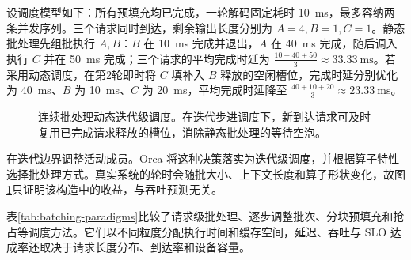 \documentclass[../textbook.tex]{subfiles}
\begin{document}
\begin{example}
设调度模型如下：所有预填充均已完成，一轮解码固定耗时 \qty{10}{\milli\second}，最多容纳两条并发序列。三个请求同时到达，剩余输出长度分别为 $A=4,B=1,C=1$。静态批处理先组批执行 $A,B$：$B$ 在 \qty{10}{\milli\second} 完成并退出，$A$ 在 \qty{40}{\milli\second} 完成，随后调入执行 $C$ 并在 \qty{50}{\milli\second} 完成；三个请求的平均完成时延为 $\frac{10+40+50}{3}\approx \qty{33.33}{\milli\second}$。若采用动态调度，在第2轮即时将 $C$ 填补入 $B$ 释放的空闲槽位，完成时延分别优化为 \qty{40}{\milli\second}、$B$ 为 \qty{10}{\milli\second}、$C$ 为 \qty{20}{\milli\second}，平均完成时延降至 $\frac{40+10+20}{3}\approx \qty{23.33}{\milli\second}$。

\begin{figure}[htbp]
\centering
{}
\caption[连续批处理动态迭代级调度]{连续批处理动态迭代级调度。在迭代步进调度下，新到达请求可及时复用已完成请求释放的槽位，消除静态批处理的等待空泡。}\label{fig:schedule-continuous}
\end{figure}

在迭代边界调整活动成员。Orca 将这种决策落实为迭代级调度，并根据算子特性选择批处理方式\cite{yu2022orca}。真实系统的轮时会随批大小、上下文长度和算子形状变化，故图\ref{fig:schedule-continuous}只证明该构造中的收益，与吞吐预测无关。
\end{example}

表\ref{tab:batching-paradigms}比较了请求级批处理、逐步调整批次、分块预填充和抢占等调度方法。它们以不同粒度分配执行时间和缓存空间，延迟、吞吐与 SLO 达成率还取决于请求长度分布、到达率和设备容量。
\end{document}
